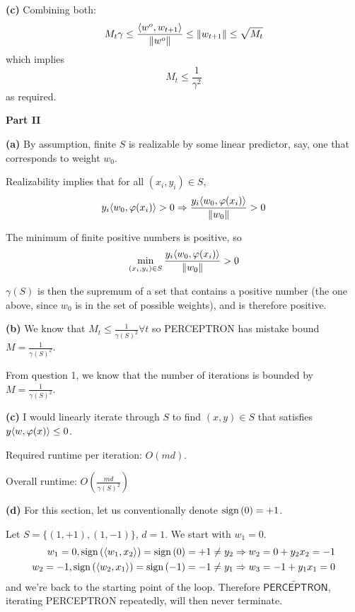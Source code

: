 \documentclass[a4paper, 12pt]{article}
\begin{document}
\begin{problem} [Problem 2]
    \textbf{(c)} Combining both: \begin{equation*}
    M_t \gamma \leq \frac{\langle w^o, w_{t+1} \rangle}{\lVert w^o\rVert} \leq \lVert w_{t+1}\rVert \leq \sqrt{M_t}
    \end{equation*}
    which implies \begin{equation*}
    M_t \leq \frac{1}{\gamma^2}
    \end{equation*}
    as required.

    \textbf{Part II}

    \textbf{(a)} By assumption, finite $S$ is realizable by some linear predictor, say, one that corresponds to weight $w_0$. 
    
    Realizability implies that for all $(x_i, y_i) \in S$, \begin{equation*}
        y_i \langle w_0, \varphi(x_i) \rangle > 0 \Rightarrow \frac{y_i \langle w_0, \varphi(x_i) \rangle}{\lVert w_0\rVert} > 0
    \end{equation*}

    The minimum of finite positive numbers is positive, so \begin{equation*}
    \min_{(x_i, y_i) \in S} \frac{y_i \langle w_0, \varphi(x_i) \rangle}{\lVert w_0\rVert} > 0
    \end{equation*}

    $\gamma(S)$ is then the supremum of a set that contains a positive number (the one above, since $w_0$ is in the set of possible weights), and is therefore positive.

    \textbf{(b)}  We know that $M_t \leq \frac{1}{\gamma(S)^2} \forall t$ so \textsf{PERCEPTRON} has mistake bound $M = \frac{1}{\gamma(S)^2}$.

    From question 1, we know that the number of iterations is bounded by $M = \frac{1}{\gamma(S)^2}$.

    \textbf{(c)}  I would linearly iterate through $S$ to find $(x, y) \in S$ that satisfies $y \langle w, \varphi(x) \rangle \leq 0$.

    Required runtime per iteration: $O(md)$.

    Overall runtime: $O\left(\frac{md}{\gamma(S)^2}\right)$

    \textbf{(d)} For this section, let us conventionally denote $\mathrm{sign}\left(0\right) = +1$.

    Let $S = \{(1, +1), (1, -1)\}$, $d = 1$. We start with $w_1 = 0$.
    \begin{align*}
        w_1 = 0, \mathrm{sign}\left(\langle w_1, x_2 \rangle\right) = \mathrm{sign}\left(0\right) = +1 \neq y_2 &\Rightarrow w_2 = 0 + y_2x_2 = -1 \\
        w_2 = -1, \mathrm{sign}\left(\langle w_2, x_1 \rangle\right) = \mathrm{sign}\left(-1\right) = -1 \neq y_1 &\Rightarrow w_3 = -1 + y_1x_1 = 0
    \end{align*}
    and we're back to the starting point of the loop. Therefore $\widetilde{\textsf{PERCEPTRON}}$, iterating \textsf{PERCEPTRON} repeatedly, will then never terminate.


\end{problem}
\end{document}
